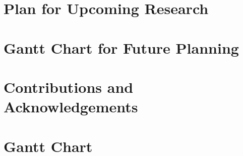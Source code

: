 \documentclass{report}
\begin{document}
\section{Plan for Upcoming Research}
\label{sec:plan_upcoming}


\section{Gantt Chart for Future Planning}
\label{sec:gantt_chart_text}


\section{Contributions and Acknowledgements}
\label{sec:contribution_acknowledgements}


\newpage
\section{Gantt Chart}
\label{sec:gantt}


\newpage
\printbibliography
\end{document}
